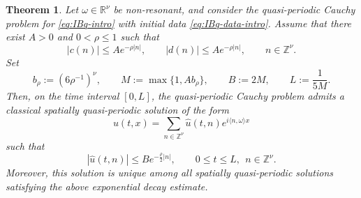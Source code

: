 \documentclass[10pt,a4paper]{amsart}
\newtheorem{theorem}{Theorem}
\begin{document}
\begin{theorem}\label{thm:exponential decay}
Let $\omega\in \mathbb{R}^{\nu}$ be non-resonant, and consider the quasi-periodic
Cauchy problem for \eqref{eq:IBq-intro}
with initial data \eqref{eq:IBq-data-intro}.
Assume that there exist $A>0$ and $0<\rho\leq 1$ such that
\[
|c(n)|\leq A e^{-\rho |n|},
\qquad
|d(n)|\leq A e^{-\rho |n|},
\qquad n\in \mathbb{Z}^{\nu}.
\]
Set
\[
b_{\rho}:=(6\rho^{-1})^{\nu},
\qquad
M:=\max\{1,Ab_{\rho}\},
\qquad
B:=2M,
\qquad
L:=\frac{1}{5M}.
\]
Then, on the time interval $[0,L]$, the quasi-periodic Cauchy problem admits a classical spatially
quasi-periodic solution of the form
\[
u(t,x)=\sum_{n\in \mathbb{Z}^{\nu}} \widehat{u}(t,n)e^{i\langle n,\omega\rangle x}
\]
such that
\[
|\widehat{u}(t,n)|\leq B e^{-\frac{\rho}{2}|n|},
\qquad
0\leq t\leq L,\ \ n\in \mathbb{Z}^{\nu}.
\]
Moreover, this solution is unique among all spatially quasi-periodic solutions
satisfying the above exponential decay estimate.
\end{theorem}
\end{document}
